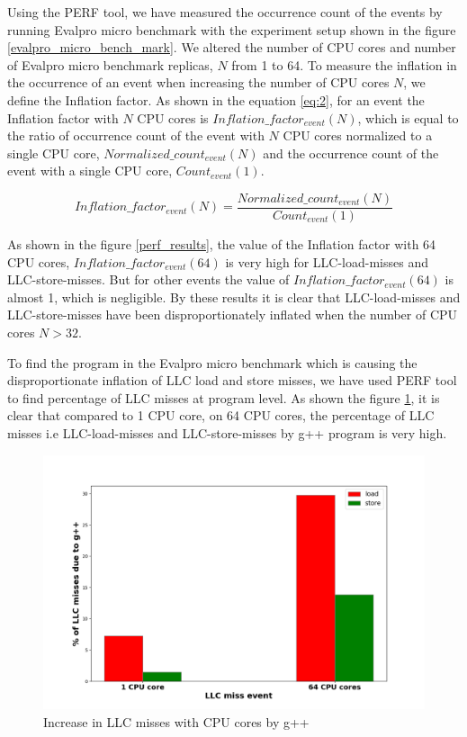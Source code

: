 \documentclass[sigconf]{acmart}
\begin{document}
 Using the PERF tool, we have measured the occurrence count of the events by running Evalpro micro benchmark with the experiment setup shown in the figure \ref{evalpro_micro_bench_mark}. We altered the number of CPU cores and number of Evalpro micro benchmark replicas, $N$ from 1 to 64. To measure the inflation in the occurrence of an event when increasing the number of CPU cores $N$, we define the Inflation factor. As shown in the equation \ref{eq:2}, for an event the Inflation factor with $N$ CPU cores is  $Inflation\_factor_{event}(N)$, which is equal to the ratio of occurrence count of the event with $N$ CPU cores normalized to a single CPU core, $Normalized\_count_{event}(N)$ and the occurrence count of the event  with a single CPU core, $Count_{event}(1)$.

\begin{equation}
  Inflation\_factor_{event}(N)=\frac{Normalized\_count_{event}(N)}{Count_{event}(1)}
  \label{eq:2}
\end{equation}

As shown in the figure \ref{perf_results}, the value of the  Inflation factor with 64 CPU cores, $Inflation\_factor_{event}(64)$ is very high for LLC-load-misses and LLC-store-misses. But  for other  events the value of $Inflation\_factor_{event}(64)$ is almost 1, which is negligible. By these results it is clear that LLC-load-misses and LLC-store-misses have been disproportionately inflated when the number of CPU cores $N>32$.

To find the  program in the Evalpro micro benchmark which is causing the  disproportionate inflation of LLC load and store misses, we have used PERF tool to find percentage of LLC misses at program level. As shown the figure \ref{llc_misses_gplusplus}, it is clear that  compared to 1 CPU core, on 64 CPU cores, the percentage of LLC misses i.e LLC-load-misses and LLC-store-misses by g++ program is very high. 

\begin{figure}[!htb]
  \centering
  \includegraphics[width=\linewidth]{Pictures/llc_misses_g++.png}
  \caption{Increase in LLC misses with CPU cores by g++ }
  \label{llc_misses_gplusplus}
\end{figure}
\end{document}
